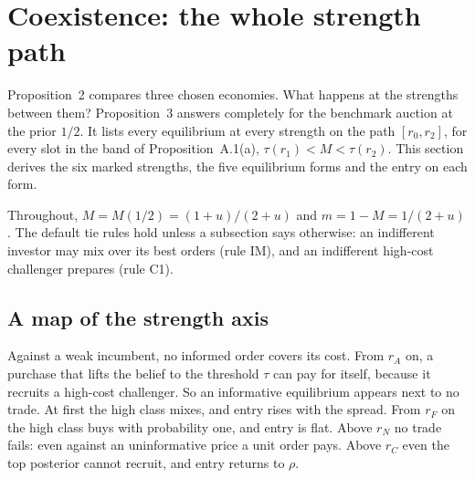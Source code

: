 \section{Coexistence: the whole strength path}\label{sec:08_coexistence}

Proposition~2 compares three chosen economies. What happens at the strengths between them? Proposition~3 answers
completely for the benchmark auction at the prior \(1/2\). It lists every equilibrium at every strength on the path
\([r_0,r_2]\), for every slot in the band of Proposition~A.1(a), \(\tau(r_1)<M<\tau(r_2)\). This section derives the
six marked strengths, the five equilibrium forms and the entry on each form.

Throughout, \(M=M(1/2)=(1+u)/(2+u)\) and \(m=1-M=1/(2+u)\). The default tie rules hold unless a subsection says
otherwise: an indifferent investor may mix over its best orders (rule IM), and an indifferent high-cost challenger
prepares (rule C1).

\subsection{A map of the strength axis}\label{sec:08_coexistence-map}


\begin{intuition}
Against a weak incumbent, no informed order covers its cost. From \(r_A\) on, a purchase that lifts
the belief to the threshold \(\tau\) can pay for itself, because it recruits a high-cost challenger. So an informative
equilibrium appears next to no trade. At first the high class mixes, and entry rises with the spread. From \(r_F\) on
the high class buys with probability one, and entry is flat. Above \(r_N\) no trade fails: even against an
uninformative price a unit order pays. Above \(r_C\) even the top posterior cannot recruit, and entry returns to \(\rho\).
\end{intuition}


